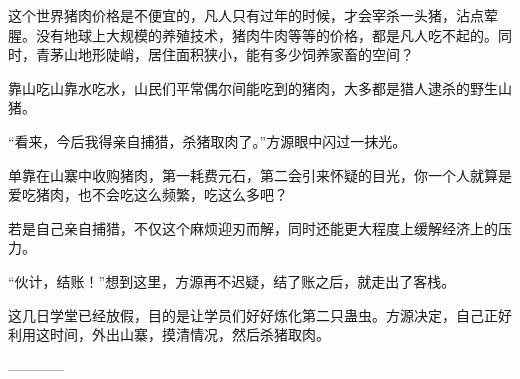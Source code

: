 \begin{this_body}
这个世界猪肉价格是不便宜的，凡人只有过年的时候，才会宰杀一头猪，沾点荤腥。没有地球上大规模的养殖技术，猪肉牛肉等等的价格，都是凡人吃不起的。同时，青茅山地形陡峭，居住面积狭小，能有多少饲养家畜的空间？

靠山吃山靠水吃水，山民们平常偶尔间能吃到的猪肉，大多都是猎人逮杀的野生山猪。

“看来，今后我得亲自捕猎，杀猪取肉了。”方源眼中闪过一抹光。

单靠在山寨中收购猪肉，第一耗费元石，第二会引来怀疑的目光，你一个人就算是爱吃猪肉，也不会吃这么频繁，吃这么多吧？

若是自己亲自捕猎，不仅这个麻烦迎刃而解，同时还能更大程度上缓解经济上的压力。

“伙计，结账！”想到这里，方源再不迟疑，结了账之后，就走出了客栈。

这几日学堂已经放假，目的是让学员们好好炼化第二只蛊虫。方源决定，自己正好利用这时间，外出山寨，摸清情况，然后杀猪取肉。

------------

\end{this_body}

